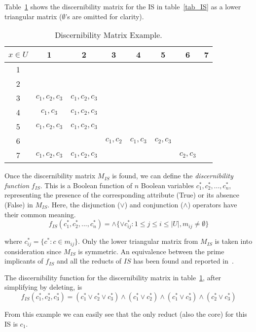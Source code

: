 \documentclass[authoryear,11pt]{elsarticle}
\begin{document}
  Table~\ref{tab_DM} shows the discernibility matrix for the IS in table~\ref{tab_IS} as a lower triangular 
  matrix ($\emptyset$'s are omitted for clarity).
  
   \begin{table}[htb]
		\caption{Discernibility Matrix Example.} \label{tab_DM}
		\centering
 	\begin{tabular}{c|ccccccc}
 		$x \in U$ & 1 & 2 &  3 & 4 & 5 &  6 & 7\\
 		\hline
		1 &&&&&&&\\
		2 &&&&&&&\\
		3 & $c_1,c_2,c_3$ & $c_1,c_2,c_3$ &&&&&\\
		4 & $c_1,c_3$ & $c_1,c_2,c_3$ &&&&&\\
		5 & $c_1,c_2,c_3$ & $c_1,c_2,c_3$ &&&&&\\
		6 &&& $c_1,c_2$ & $c_1,c_3$ & $c_2,c_3$ &&\\
		7 & $c_1,c_2,c_3$ & $c_1,c_2,c_3$ &&&& $c_2,c_3$ &\\
 	\end{tabular}             
 \end{table}
  
  Once the discernibility matrix $M_{IS}$ is found, we can define the \textit{discernibility function} $f_{IS}$.
  This is a Boolean function of $n$ Boolean variables $c_1^*, c_2^*,...,c_n^*$, representing the presence of
  the corresponding attribute (True) or its absence (False) in $M_{IS}$. Here, the disjunction ($\vee$) and 
  conjunction ($\wedge$) operators have their common meaning.
  \begin{equation}
  	f_{IS}(c_1^*, c_2^*,...,c_n^*)=\wedge \lbrace \vee c_{ij}^* : 1 \leq j \leq i \leq |U|, 
  									m_{ij} \neq \emptyset \rbrace
  \end{equation}

  where $c_{ij}^*=\lbrace c^* : c \in m_{ij} \rbrace$. Only the lower triangular matrix from $M_{IS}$ is
  taken into consideration since $M_{IS}$ is symmetric. An equivalence between the prime implicants of
  $f_{IS}$ and all the reducts of $IS$ has been found and reported in~\citep{Pawlak07}.
  
  The discernibility function for the discernibility matrix in table~\ref{tab_DM}, after simplifying by 
  deleting, is  
  $$f_{IS}(c_1^*,c_2^*,c_3^*)=(c_1^* \vee c_2^* \vee c_3^*) \wedge (c_1^* \vee c_2^*) 
   \wedge (c_1^* \vee c_3^*) \wedge (c_2^* \vee c_3^*) $$
  
  From this example we can easily see that the only reduct (also the core) for this IS is $c_1$.
  
\end{document}
